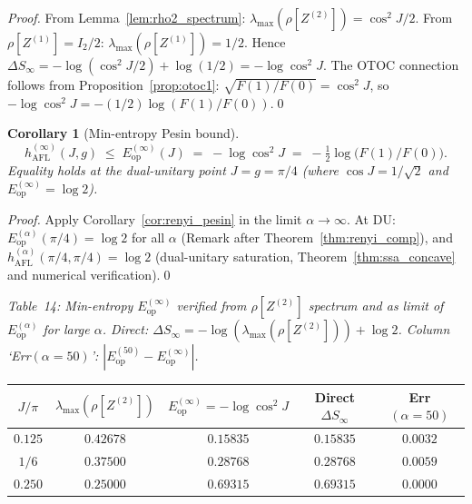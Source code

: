 \documentclass[12pt,a4paper]{article}
\newtheorem{corollary}[theorem]{Corollary}
\begin{document}
\begin{proof}
From Lemma~\ref{lem:rho2_spectrum}: $\lambda_\mathrm{max}(\rho[Z^{(2)}]) = \cos^2\!J/2$.
From $\rho[Z^{(1)}] = I_2/2$: $\lambda_\mathrm{max}(\rho[Z^{(1)}]) = 1/2$.
Hence $\Delta S_\infty = -\log(\cos^2\!J/2) + \log(1/2) = -\log\cos^2\!J$.
The OTOC connection follows from Proposition~\ref{prop:otoc1}: $\sqrt{F(1)/F(0)}=\cos^2\!J$,
so $-\log\cos^2\!J = -(1/2)\log(F(1)/F(0))$.\qed
\end{proof}

\begin{corollary}[Min-entropy Pesin bound]\label{cor:min_entropy_pesin}
\begin{equation}\label{eq:min_pesin}
  \boxed{h^{(\infty)}_\mathrm{AFL}(J,g)
  \;\le\; E^{(\infty)}_\mathrm{op}(J)
  \;=\; -\log\cos^2\!J
  \;=\; -\tfrac{1}{2}\log\!\bigl(F(1)/F(0)\bigr).}
\end{equation}
Equality holds at the dual-unitary point $J=g=\pi/4$ (where $\cos J = 1/\sqrt{2}$
and $E^{(\infty)}_\mathrm{op} = \log 2$).
\end{corollary}

\begin{proof}
Apply Corollary~\ref{cor:renyi_pesin} in the limit $\alpha\to\infty$.  At DU:
$E^{(\alpha)}_\mathrm{op}(\pi/4) = \log 2$ for all $\alpha$ (Remark after
Theorem~\ref{thm:renyi_comp}), and $h^{(\alpha)}_\mathrm{AFL}(\pi/4,\pi/4) = \log 2$
(dual-unitary saturation, Theorem~\ref{thm:ssa_concave} and numerical verification).\qed
\end{proof}

\noindent\textit{Table~14: Min-entropy $E^{(\infty)}_\mathrm{op}$ verified from
$\rho[Z^{(2)}]$ spectrum and as limit of $E^{(\alpha)}_\mathrm{op}$ for large $\alpha$.
Direct: $\Delta S_\infty = -\log(\lambda_\mathrm{max}(\rho[Z^{(2)}])) + \log 2$.
Column `Err$(\alpha{=}50)$': $|E^{(50)}_\mathrm{op} - E^{(\infty)}_\mathrm{op}|$.}

\begin{center}
\begin{tabular}{@{}ccccc@{}}
\toprule
$J/\pi$ & $\lambda_\mathrm{max}(\rho[Z^{(2)}])$ & $E^{(\infty)}_\mathrm{op}=-\log\cos^2\!J$
  & Direct $\Delta S_\infty$ & Err$(\alpha{=}50)$\\
\midrule
$0.125$ & $0.42678$ & $0.15835$ & $0.15835$ & $0.0032$\\
$1/6$   & $0.37500$ & $0.28768$ & $0.28768$ & $0.0059$\\
$0.250$ & $0.25000$ & $0.69315$ & $0.69315$ & $0.0000$\\
\bottomrule
\end{tabular}
\end{center}
\end{document}
